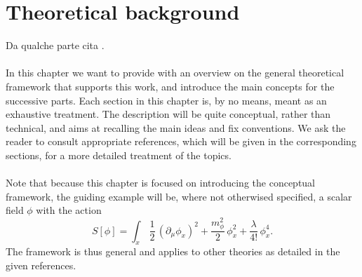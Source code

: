 \chapter{Theoretical background}
\label{chap:background}

Da qualche parte cita \cite{carosso2020novel}. \\~\\
In this chapter we want to provide with an overview on the general theoretical framework that supports this work, and introduce the main concepts for the successive parts. Each section in this chapter is, by no means, meant as an exhaustive treatment. The description will be quite conceptual, rather than technical, and aims at recalling the main ideas and fix conventions. We ask the reader to consult appropriate references,  which will be given in the corresponding sections, for a more detailed treatment of the topics. \\~\\
Note that because this chapter is focused on introducing the conceptual framework, the guiding example will be, where not otherwised specified, a scalar field $\phi$ with the action 
\begin{equation}
    S[\phi] = \int_x \, \frac{1}{2} \, (\partial_\mu \phi_x)^2 + \frac{m_\phi^2}{2} \, \phi_x^2 + \frac{\lambda}{4!} \, \phi_x^4.
    \label{eq:phi4_action}
\end{equation}
The framework is thus general and applies to other theories as detailed in the given references. \\~\\
